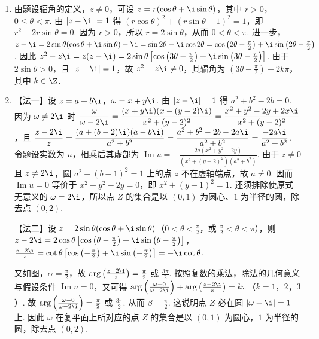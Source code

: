 \documentclass[UTF8,a4paper,oneside,11pt]{ctexbook}
\begin{document}
\begin{solution}
\begin{enumerate}
\item 由题设辐角的定义，\(z\neq0\)，可设 \(z=r(\cos\theta+\i\sin\theta)\)，其中 \(r>0\)，\(0\leqslant\theta<\pi\). 由 \(|z-\i|=1\) 得 \((r\cos\theta)^2+(r\sin\theta-1)^2=1\)，即 \(r^2-2r\sin\theta=0\). 因为 \(r>0\)，所以 \(r=2\sin\theta\)，从而 \(0<\theta<\pi\). 进一步，
\(z-\i=2\sin\theta(\cos\theta+\i\sin\theta)-\i=\sin2\theta-\i\cos2\theta=\cos\left(2\theta-\frac{\pi}{2}\right)+\i\sin\left(2\theta-\frac{\pi}{2}\right)\).
因此
\(z^2-z\i=z(z-\i)=2\sin\theta\left[\cos\left(3\theta-\frac{\pi}{2}\right)+\i\sin\left(3\theta-\frac{\pi}{2}\right)\right]\). 由于 \(2\sin\theta>0\)，且 \(|z-\i|=1\)，故 \(z^2-z\i\neq0\)，其辐角为 \(\left(3\theta-\frac{\pi}{2}\right)+2k\pi\)，其中 \(k\in\Z\).
\item 【法一】设 \(z=a+b\i\)，\(\omega=x+y\i\). 由 \(|z-\i|=1\) 得 \(a^2+b^2-2b=0\). 因为 \(\omega\neq2\i\) 时
\(\displaystyle\frac{\omega}{\omega-2\i}=\frac{(x+y\i)(x-(y-2)\i)}{x^2+(y-2)^2}=\frac{x^2+y^2-2y+2x\i}{x^2+(y-2)^2}\)，且
\(\displaystyle\frac{z-2\i}{z}=\frac{(a+(b-2)\i)(a-b\i)}{a^2+b^2}=\frac{a^2+b^2-2b-2a\i}{a^2+b^2}=\frac{-2a\i}{a^2+b^2}\). 令题设实数为 \(u\)，相乘后其虚部为
\(\displaystyle\operatorname{Im}u=-\frac{2a(x^2+y^2-2y)}{(x^2+(y-2)^2)(a^2+b^2)}\). 由于 \(z\neq0\) 且 \(z\neq2\i\)，圆 \(a^2+(b-1)^2=1\) 上的点 \(z\) 不在虚轴端点，故 \(a\neq0\). 因而 \(\operatorname{Im}u=0\) 等价于 \(x^2+y^2-2y=0\)，即 \(x^2+(y-1)^2=1\). 还须排除使原式无意义的 \(\omega=2\i\)，所以点 \(Z\) 的集合是以 \((0,1)\) 为圆心、\(1\) 为半径的圆，除去点 \((0,2)\).

【法二】设 \(z = 2\sin\theta(\cos\theta + \i\sin\theta)\)（\(0 < \theta < \frac{\pi}{2}\)，或 \(\frac{\pi}{2} < \theta < \pi\)），则 \(z - 2\i = 2\cos\theta\left[\cos\left(\theta - \frac{\pi}{2}\right) + \i\sin\left(\theta - \frac{\pi}{2}\right)\right]\)，
\(\frac{z - 2\i}{z} = \cot\theta\left[\cos\left(-\frac{\pi}{2}\right) + \i\sin\left(-\frac{\pi}{2}\right)\right] = -\i\cot\theta\).

又如图，\(\alpha = \frac{\pi}{2}\)，故 \(\arg\left(\frac{z - 2\i}{z}\right) = \frac{\pi}{2}\) 或 \(\frac{3\pi}{2}\). 按照复数的乘法，除法的几何意义与假设条件 \(\operatorname{Im}u = 0\)，又可得 \(\arg\left(\frac{\omega - 0}{\omega - 2\i}\right) + \arg\left(\frac{z - 2\i}{z}\right) = k\pi\)（\(k = 1\)，\(2\)，\(3\)）.
故 \(\arg\left(\frac{\omega - 0}{\omega - 2\i}\right) = \frac{\pi}{2}\) 或 \(\frac{3\pi}{2}\). 从而 \(\beta = \frac{\pi}{2}\). 这说明点 \(Z\) 必在圆 \(|\omega - \i| = 1\) 上. 因此 \(\omega\) 在复平面上所对应的点 \(Z\) 的集合是以 \((0,1)\) 为圆心，\(1\) 为半径的圆，除去点 \((0,2)\).
\end{enumerate}
\end{solution}
\end{document}
